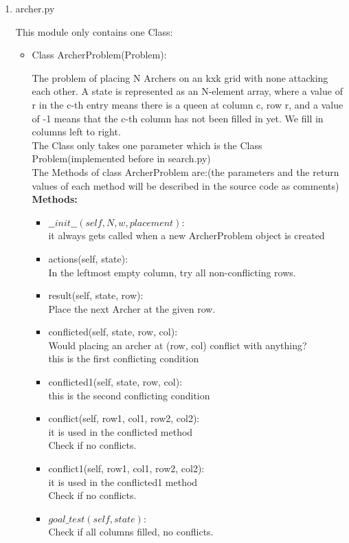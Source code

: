 \documentclass{article}
\begin{document}
\begin{enumerate}
\begin{itemize}
   \end{itemize} 
  \item archer.py 
  \par This module only contains one Class:
  \begin{itemize}
      \item Class ArcherProblem(Problem):
      \par The problem of placing N Archers on an kxk grid with none attacking
    each other.  A state is represented as an N-element array, where
    a value of r in the c-th entry means there is a queen at column c,
    row r, and a value of -1 means that the c-th column has not been
    filled in yet.  We fill in columns left to right.
    \\The Class only takes one parameter which is the Class Problem(implemented before in search.py)
    \\The Methods of class ArcherProblem are:(the parameters and the return values of each method will be described in the source code as comments)
    \\
    \textbf {Methods:}
        \begin{itemize}
          \item $\_\_init\_\_(self, N,w,placement):$
          \\it always gets called when a new ArcherProblem object is created
          \item actions(self, state):
          \\In the leftmost empty column, try all non-conflicting rows.
          \item result(self, state, row):
          \\Place the next Archer at the given row.
          \item conflicted(self, state, row, col):
          \\Would placing an archer at (row, col) conflict with anything?
          \\this is the first conflicting condition
          \item conflicted1(self, state, row, col):
          \\this is the second conflicting condition
          \item conflict(self, row1, col1, row2, col2):
          \\it is used in the conflicted method
          \\Check if  no conflicts.
          \item conflict1(self, row1, col1, row2, col2):
          \\it is used in the conflicted1 method
          \\Check if  no conflicts.
          \item $goal\_test(self, state):$
          \\Check if all columns filled, no conflicts.
       \end{itemize}
    

\end{itemize}
\end{enumerate}
\end{document}
